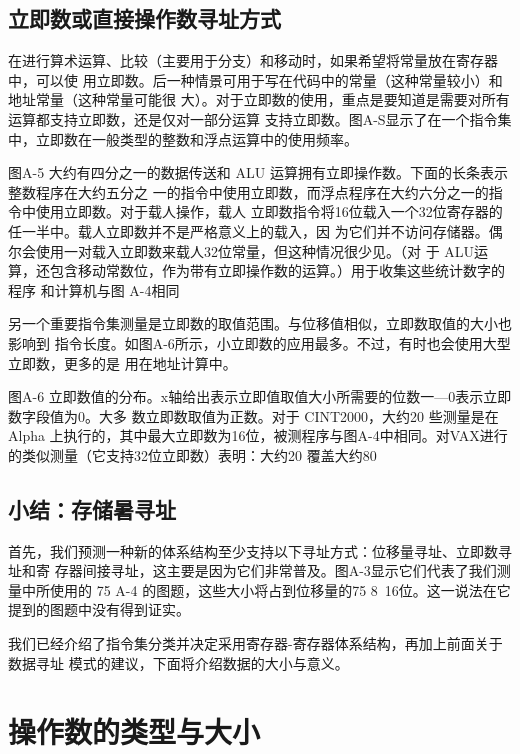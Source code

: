 \subsection{立即数或直接操作数寻址方式}
在进行算术运算、比较（主要用于分支）和移动时，如果希望将常量放在寄存器中，可以使
用立即数。后一种情景可用于写在代码中的常量（这种常量较小）和地址常量（这种常量可能很
大）。对于立即数的使用，重点是要知道是需要对所有运算都支持立即数，还是仅对一部分运算
支持立即数。图A-S显示了在一个指令集中，立即数在一般类型的整数和浮点运算中的使用频率。

图A-5 大约有四分之一的数据传送和 ALU 运算拥有立即操作数。下面的长条表示整数程序在大约五分之
一的指令中使用立即数，而浮点程序在大约六分之一的指令中使用立即数。对于载人操作，载人
立即数指令将16位载入一个32位寄存器的任一半中。载人立即数并不是严格意义上的载入，因
为它们并不访问存储器。偶尔会使用一对载入立即数来载人32位常量，但这种情况很少见。（对
于 ALU运算，还包含移动常数位，作为带有立即操作数的运算。）用于收集这些统计数字的程序
和计算机与图 A-4相同

另一个重要指令集测量是立即数的取值范围。与位移值相似，立即数取值的大小也影响到
指令长度。如图A-6所示，小立即数的应用最多。不过，有时也会使用大型立即数，更多的是
用在地址计算中。

图A-6 立即数值的分布。x轴给出表示立即值取值大小所需要的位数一—0表示立即数字段值为0。大多
数立即数取值为正数。对于 CINT2000，大约20%
些测量是在 Alpha 上执行的，其中最大立即数为16位，被测程序与图A-4中相同。对VAX进行
的类似测量（它支持32位立即数）表明：大约20%
覆盖大约80%

\subsection{小结：存储暑寻址}
首先，我们预测一种新的体系结构至少支持以下寻址方式：位移量寻址、立即数寻址和寄
存器间接寻址，这主要是因为它们非常普及。图A-3显示它们代表了我们测量中所使用的
75%
A-4 的图题，这些大小将占到位移量的75%
8~16位。这一说法在它提到的图题中没有得到证实。

我们已经介绍了指令集分类并决定采用寄存器-寄存器体系结构，再加上前面关于数据寻址
模式的建议，下面将介绍数据的大小与意义。

\section{操作数的类型与大小}

